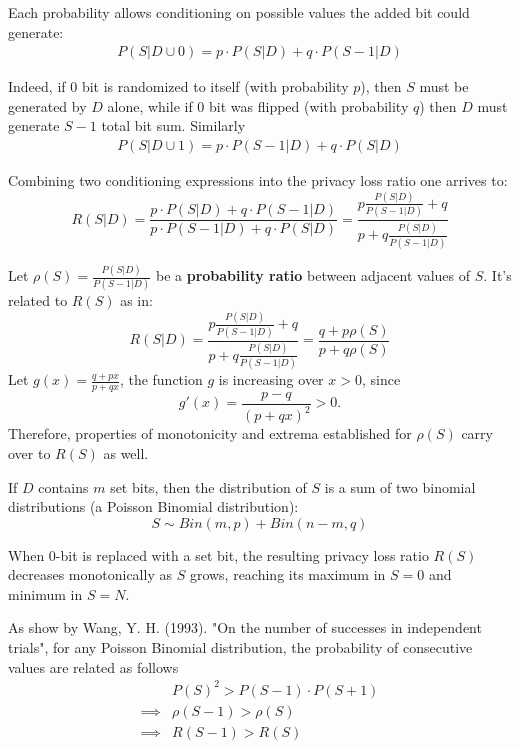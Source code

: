 \documentclass[11pt]{article}
\begin{document}
Each probability allows conditioning on possible values the added bit could generate:
\begin{align}\label{lem:rs100}
P(S|D \cup 0) = p \cdot P(S | D ) + q \cdot P( S - 1 | D) 
\end{align}

Indeed, if $0$ bit is randomized to itself (with probability $p$), then $S$ must be generated by $D$ alone, while if $0$ bit was flipped (with probability $q$) then $D$ must generate $S-1$ total bit sum. Similarly 
\begin{align}
P(S|D \cup 1) = p  \cdot P(S -1 | D ) + q \cdot P( S  | D) 
\end{align}

Combining two conditioning expressions into the privacy loss ratio one arrives to:
\begin{equation} \label{eq:plratio}
R(S|D)=  \frac{p \cdot P(S | D ) + q \cdot P( S - 1 | D) } {  p  \cdot P(S -1 | D ) + q \cdot P( S  | D)  } = \frac{ p \frac{P(S | D )}{P(S - 1| D )} + q } { p + q \frac{P(S | D )}{P(S - 1| D )} }
\end{equation}

Let $\rho(S) = \frac{P(S | D )}{P(S - 1| D )}$ be a \textbf{probability ratio} between adjacent values of $S$.  It's related to $R(S)$ as in:
\[ 
R(S|D) =  \frac{ p \frac{P(S | D )}{P(S - 1| D )} + q } { p + q \frac{P(S | D )}{P(S - 1| D )} } = \frac{q + p\rho(S)}{p + q\rho(S)}
\]
Let $g(x) = \frac{q + px}{p + qx}$, the function $g$ is increasing over $x>0$, since
\[ g'(x) = \frac{p-q}{(p+qx)^2} > 0. \]
Therefore, properties of monotonicity and extrema established for $\rho(S)$  carry over to $R(S)$ as well.
 
 If  $D$ contains $m$ set bits, then the distribution of $S$ is a sum of two binomial distributions (a Poisson Binomial distribution): 
 \[ S  \sim Bin(m,p) + Bin(n-m,q) \]
 
 \begin{lem} \label{lem:rs1}
When 0-bit is replaced with a set bit, the resulting privacy loss ratio $R(S)$ decreases monotonically as $S$ grows, reaching its maximum in $S=0$ and minimum in $S=N$.
\end{lem}
\begin{pf}
 As show by Wang, Y. H. (1993). "On the number of successes in independent trials", for any Poisson Binomial distribution, the probability of consecutive values are related as follows
 \begin{align*}
 & P(S)^2  > P(S-1) \cdot P(S+1) \\
\implies &  \rho(S-1) > \rho(S) \\
\implies & R(S-1) > R(S)
\end{align*}
\end{pf}
\end{document}
